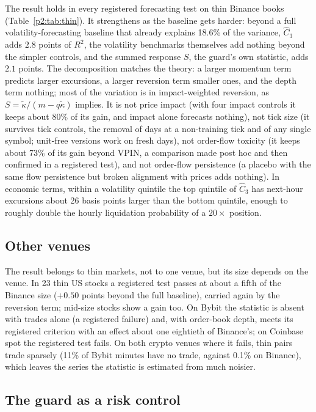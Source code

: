     The result holds in every registered forecasting test on thin Binance books (Table~\ref{p2:tab:thin}). It strengthens as the baseline gets harder: beyond a full volatility-forecasting baseline that already explains 18.6\% of the variance, $\hat C_3$ adds $2.8$ points of $R^2$, the volatility benchmarks themselves add nothing beyond the simpler controls, and the summed response $S$, the guard's own statistic, adds $2.1$ points. The decomposition matches the theory: a larger momentum term predicts larger excursions, a larger reversion term smaller ones, and the depth term nothing; most of the variation is in impact-weighted reversion, as $S=\tilde\kappa/(m-q\tilde\kappa)$ implies. It is not price impact (with four impact controls it keeps about 80\% of its gain, and impact alone forecasts nothing), not tick size (it survives tick controls, the removal of days at a non-training tick and of any single symbol; unit-free versions work on fresh days), not order-flow toxicity (it keeps about 73\% of its gain beyond VPIN, a comparison made post hoc and then confirmed in a registered test), and not order-flow persistence (a placebo with the same flow persistence but broken alignment with prices adds nothing). In economic terms, within a volatility quintile the top quintile of $\hat C_3$ has next-hour excursions about 26 basis points larger than the bottom quintile, enough to roughly double the hourly liquidation probability of a $20\times$ position.

    \subsection{Other venues}

    The result belongs to thin markets, not to one venue, but its size depends on the venue. In 23 thin US stocks a registered test passes at about a fifth of the Binance size ($+0.50$ points beyond the full baseline), carried again by the reversion term; mid-size stocks show a gain too. On Bybit the statistic is absent with trades alone (a registered failure) and, with order-book depth, meets its registered criterion with an effect about one eightieth of Binance's; on Coinbase spot the registered test fails. On both crypto venues where it fails, thin pairs trade sparsely (11\% of Bybit minutes have no trade, against 0.1\% on Binance), which leaves the series the statistic is estimated from much noisier.

    \subsection{The guard as a risk control}

